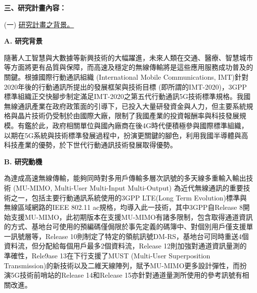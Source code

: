 \documentclass[a4paper,12pt]{article}%
\newcommand\n{\mbox{\quad}} %
\begin{document}
\graphicspath{{./figure/}}





\setcounter{page}{1}

\noindent \textbf{三、研究計畫內容：}


\noindent (一)	\underline{研究計畫之背景。}

\noindent \textbf{A. 研究背景}

\n 隨著人工智慧與大數據等新興技術的大幅躍進，未來人類在交通、醫療、智慧城市等方面將更有品質與保障，而高速及穩定的無線傳輸將是這些應用服務成功普及的關鍵。根據國際行動通訊組織 (International Mobile Communications, IMT)針對2020年後的行動通訊所提出的發展框架與技術目標 (即所謂的IMT-2020)，3GPP標準組織正交快腳步制定滿足IMT-2020之第五代行動通訊5G技術標準規格。我國無線通訊產業在政府政策面的引導下，已投入大量研發資金與人力，但主要系統規格與晶片技術仍受制於由國際大廠，限制了我國產業的投資報酬率與科技發展規模。有鑑於此，政府相關單位與國內廠商在後4G時代便積極參與國際標準組織，以期在5G系統與技術標準發展過程中，扮演更關鍵的腳色，利用我國半導體與高科技產業的優勢，於下世代行動通訊技術發展取得優勢。

\noindent \textbf{B. 研究動機}

\n 為達成高速無線傳輸，能夠同時對多用戶傳輸多層次訊號的多天線多重輸入輸出技術 (MU-MIMO, Multi-User Multi-Input Multi-Output) 為近代無線通訊的重要技術之一，包括主要行動通訊系統使用的3GPP LTE(Long Term Evolution)標準與無線區域網路的IEEE 802.11 ac規格，均導入此一技術，其中3GPP自Release 8開始支援MU-MIMO，此初期版本在支援MU-MIMO有諸多限制，包含取得通道資訊的方式、基地台可使用的預編碼僅侷限於事先定義的碼簿中、對個別用戶僅支援單一訊號層等，Release 10則制定了特定的領航訊號DM-RS，基地台可同時重送4個資料流，但分配給每個用戶最多2個資料流，Release 12則加強對通道資訊量測的準確性，Rele9ase 13在下行支援了MUST (Multi-User Superposition Transmission)的新技術以及二維天線陣列，賦予MU-MIMO更多設計彈性，而扮演5G技術前哨站的Release 14和Release 15亦針對通道量測所使用的參考訊號有相關改進。
\end{document}
